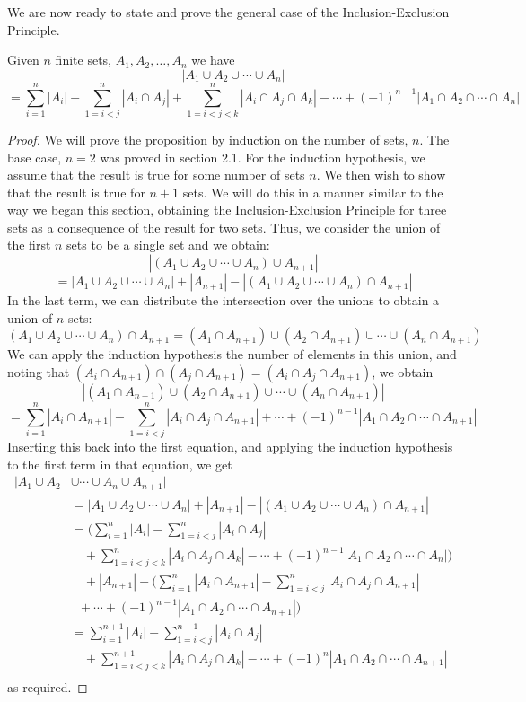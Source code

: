 \documentclass[handout]{ximera}
\begin{document}
We are now ready to state and prove the general case of the Inclusion-Exclusion Principle.
\begin{proposition}
Given $n$ finite sets, $A_1, A_2, \ldots, A_n$ we have
\[
|A_1 \cup A_2 \cup \cdots \cup A_n| 
\]
\[
= \sum_{i =1}^n |A_i| - \sum_{1 =i<j}^n |A_i\cap A_j| +
\sum_{1 =i<j< k}^n |A_i\cap A_j \cap A_k| - \cdots + (-1)^{n-1} |A_1 \cap A_2 \cap \cdots \cap A_n|
\]
\end{proposition}

\begin{proof}
We will prove the proposition by induction on the number of sets, $n$. The base case, $n=2$ was proved in section 2.1.
For the induction hypothesis, we assume that the result is true for some number of sets $n$. 
We then wish to show that the result is true for $n+1$ sets. We will do this in a manner similar to the way we began
this section, obtaining the Inclusion-Exclusion Principle for three sets as a consequence of the result for two sets.
Thus, we consider the union of the first $n$ sets to be a single set and we obtain:
\[
|(A_1 \cup A_2 \cup \cdots \cup A_n) \cup A_{n+1}| 
\]
\[
= |A_1 \cup A_2 \cup \cdots \cup A_n| + |A_{n+1}| - 
|(A_1 \cup A_2 \cup \cdots \cup A_n) \cap A_{n+1}|
\]
In the last term, we can distribute the intersection over the unions to obtain a union of $n$ sets:
\[
(A_1 \cup A_2 \cup \cdots \cup A_n) \cap A_{n+1} = 
(A_1 \cap A_{n+1}) \cup (A_2 \cap A_{n+1}) \cup \cdots \cup (A_n \cap A_{n+1})
\]
We can apply the induction hypothesis the number of elements in this union, and noting 
that $(A_i \cap A_{n+1}) \cap (A_j \cap A_{n+1})  = (A_i \cap A_j \cap A_{n+1})$, we obtain
\[
|(A_1 \cap A_{n+1}) \cup (A_2 \cap A_{n+1}) \cup \cdots \cup (A_n \cap A_{n+1})|
\]
\[
= \sum_{i = 1}^n |A_i \cap A_{n+1}| - \sum_{1 = i < j}^n |A_i \cap A_j \cap A_{n+1}| + \cdots + (-1)^{n-1} |A_1 \cap A_2 \cap \cdots \cap A_{n+1}|
\]
Inserting this back into the first equation, and applying the induction hypothesis to the 
first term in that equation, we get
\begin{align*}
|A_1 \cup A_2 &\cup \cdots \cup A_n \cup A_{n+1}|   \\[6 pt]
& =|A_1 \cup A_2 \cup \cdots \cup A_n| + |A_{n+1}| - |(A_1 \cup A_2 \cup \cdots \cup A_n) \cap A_{n+1}| \\[7 pt]
 &= \bigg( \sum_{i =1}^n |A_i| - \sum_{1 =i<j}^n |A_i\cap A_j| \\
 &\quad +\sum_{1 =i<j< k}^n |A_i\cap A_j \cap A_k| - \cdots + (-1)^{n-1} |A_1 \cap A_2 \cap \cdots \cap A_n|\bigg) \\
  &\quad+ |A_{n+1}| - \bigg(\sum_{i = 1}^n |A_i \cap A_{n+1}| - \sum_{1 = i < j}^n |A_i \cap A_j \cap A_{n+1}| \\
  &\;\;+ \cdots + (-1)^{n-1} |A_1 \cap A_2 \cap \cdots \cap A_{n+1}|\bigg)\\
  &= \sum_{i =1}^{n+1} |A_i| - \sum_{1 =i<j}^{n+1} |A_i\cap A_j| \\
& \quad +\sum_{1 =i<j< k}^{n+1} |A_i\cap A_j \cap A_k| - \cdots + (-1)^{n} |A_1 \cap A_2 \cap \cdots \cap A_{n+1}| \\
\end{align*}
as required.

\end{proof}
\end{document}
